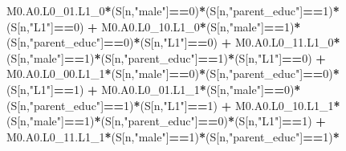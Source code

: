 \documentclass[
]{book}
\newenvironment{Shaded}{\begin{snugshade}}{\end{snugshade}}
\newcommand{\DecValTok}[1]{\textcolor[rgb]{0.00,0.00,0.81}{#1}}
\newcommand{\NormalTok}[1]{#1}
\newcommand{\SpecialCharTok}[1]{\textcolor[rgb]{0.81,0.36,0.00}{\textbf{#1}}}
\newcommand{\StringTok}[1]{\textcolor[rgb]{0.31,0.60,0.02}{#1}}
\begin{document}
\begin{Shaded}
\begin{Highlighting}[]
\NormalTok{          M0.A0.L0\_01.L1\_0}\SpecialCharTok{*}\NormalTok{(S[n,}\StringTok{"male"}\NormalTok{]}\SpecialCharTok{==}\DecValTok{0}\NormalTok{)}\SpecialCharTok{*}\NormalTok{(S[n,}\StringTok{"parent\_educ"}\NormalTok{]}\SpecialCharTok{==}\DecValTok{1}\NormalTok{)}\SpecialCharTok{*}\NormalTok{(S[n,}\StringTok{"L1"}\NormalTok{]}\SpecialCharTok{==}\DecValTok{0}\NormalTok{) }\SpecialCharTok{+}
\NormalTok{          M0.A0.L0\_10.L1\_0}\SpecialCharTok{*}\NormalTok{(S[n,}\StringTok{"male"}\NormalTok{]}\SpecialCharTok{==}\DecValTok{1}\NormalTok{)}\SpecialCharTok{*}\NormalTok{(S[n,}\StringTok{"parent\_educ"}\NormalTok{]}\SpecialCharTok{==}\DecValTok{0}\NormalTok{)}\SpecialCharTok{*}\NormalTok{(S[n,}\StringTok{"L1"}\NormalTok{]}\SpecialCharTok{==}\DecValTok{0}\NormalTok{) }\SpecialCharTok{+} 
\NormalTok{          M0.A0.L0\_11.L1\_0}\SpecialCharTok{*}\NormalTok{(S[n,}\StringTok{"male"}\NormalTok{]}\SpecialCharTok{==}\DecValTok{1}\NormalTok{)}\SpecialCharTok{*}\NormalTok{(S[n,}\StringTok{"parent\_educ"}\NormalTok{]}\SpecialCharTok{==}\DecValTok{1}\NormalTok{)}\SpecialCharTok{*}\NormalTok{(S[n,}\StringTok{"L1"}\NormalTok{]}\SpecialCharTok{==}\DecValTok{0}\NormalTok{) }\SpecialCharTok{+}
\NormalTok{          M0.A0.L0\_00.L1\_1}\SpecialCharTok{*}\NormalTok{(S[n,}\StringTok{"male"}\NormalTok{]}\SpecialCharTok{==}\DecValTok{0}\NormalTok{)}\SpecialCharTok{*}\NormalTok{(S[n,}\StringTok{"parent\_educ"}\NormalTok{]}\SpecialCharTok{==}\DecValTok{0}\NormalTok{)}\SpecialCharTok{*}\NormalTok{(S[n,}\StringTok{"L1"}\NormalTok{]}\SpecialCharTok{==}\DecValTok{1}\NormalTok{) }\SpecialCharTok{+}
\NormalTok{          M0.A0.L0\_01.L1\_1}\SpecialCharTok{*}\NormalTok{(S[n,}\StringTok{"male"}\NormalTok{]}\SpecialCharTok{==}\DecValTok{0}\NormalTok{)}\SpecialCharTok{*}\NormalTok{(S[n,}\StringTok{"parent\_educ"}\NormalTok{]}\SpecialCharTok{==}\DecValTok{1}\NormalTok{)}\SpecialCharTok{*}\NormalTok{(S[n,}\StringTok{"L1"}\NormalTok{]}\SpecialCharTok{==}\DecValTok{1}\NormalTok{) }\SpecialCharTok{+}
\NormalTok{          M0.A0.L0\_10.L1\_1}\SpecialCharTok{*}\NormalTok{(S[n,}\StringTok{"male"}\NormalTok{]}\SpecialCharTok{==}\DecValTok{1}\NormalTok{)}\SpecialCharTok{*}\NormalTok{(S[n,}\StringTok{"parent\_educ"}\NormalTok{]}\SpecialCharTok{==}\DecValTok{0}\NormalTok{)}\SpecialCharTok{*}\NormalTok{(S[n,}\StringTok{"L1"}\NormalTok{]}\SpecialCharTok{==}\DecValTok{1}\NormalTok{) }\SpecialCharTok{+}
\NormalTok{          M0.A0.L0\_11.L1\_1}\SpecialCharTok{*}\NormalTok{(S[n,}\StringTok{"male"}\NormalTok{]}\SpecialCharTok{==}\DecValTok{1}\NormalTok{)}\SpecialCharTok{*}\NormalTok{(S[n,}\StringTok{"parent\_educ"}\NormalTok{]}\SpecialCharTok{==}\DecValTok{1}\NormalTok{)}\SpecialCharTok{*}

\end{Highlighting}
\end{Shaded}
\end{document}
